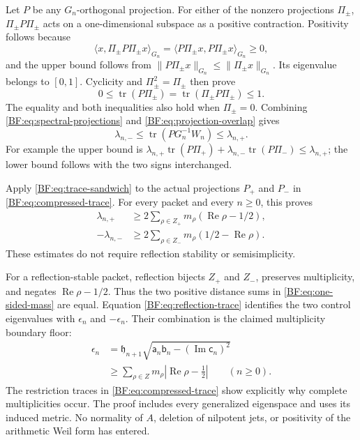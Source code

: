 Let \(P\) be any \(G_n\)-orthogonal projection.
For either of the nonzero projections \(\Pi_\pm\),
\(\Pi_\pm P\Pi_\pm\) acts on a one-dimensional subspace as a
positive contraction.  Positivity follows because
\[
\langle x,\Pi_\pm P\Pi_\pm x\rangle_{G_n}
=\langle P\Pi_\pm x,P\Pi_\pm x\rangle_{G_n}\ge0,
\]
and the upper bound follows from
\(\|P\Pi_\pm x\|_{G_n}\le\|\Pi_\pm x\|_{G_n}\).
Its eigenvalue belongs to \([0,1]\).
Cyclicity and \(\Pi_\pm^2=\Pi_\pm\) then prove
\begin{equation}
0\le\operatorname{tr}(P\Pi_\pm)
 =\operatorname{tr}(\Pi_\pm P\Pi_\pm)\le1.
\tag{BF.33}\label{BF:eq:projection-overlap}
\end{equation}
The equality and both inequalities also hold when \(\Pi_\pm=0\).
Combining \eqref{BF:eq:spectral-projections} and
\eqref{BF:eq:projection-overlap} gives
\begin{equation}
\lambda_{n,-}
\le\operatorname{tr}(P G_n^{-1}W_n)
\le\lambda_{n,+}.
\tag{BF.34}\label{BF:eq:trace-sandwich}
\end{equation}
For example the upper bound is
\(\lambda_{n,+}\operatorname{tr}(P\Pi_+)
+\lambda_{n,-}\operatorname{tr}(P\Pi_-)\le\lambda_{n,+}\);
the lower bound follows with the two signs interchanged.

Apply \eqref{BF:eq:trace-sandwich} to the actual projections
\(P_+\) and \(P_-\) in \eqref{BF:eq:compressed-trace}.
For every packet and every \(n\ge0\), this proves
\begin{equation}
\boxed{\begin{aligned}
\lambda_{n,+}
 &\ge2\sum_{\rho\in Z_+}
          m_\rho(\operatorname{Re}\rho-1/2),\\
-\lambda_{n,-}
 &\ge2\sum_{\rho\in Z_-}
          m_\rho(1/2-\operatorname{Re}\rho).
\end{aligned}}
\tag{BF.35}\label{BF:eq:one-sided-mass}
\end{equation}
These estimates do not require reflection stability or
semisimplicity.

For a reflection-stable packet, reflection bijects \(Z_+\) and
\(Z_-\), preserves multiplicity, and negates
\(\operatorname{Re}\rho-1/2\).  Thus the two positive distance
sums in \eqref{BF:eq:one-sided-mass} are equal.
Equation \eqref{BF:eq:reflection-trace} identifies the two control
eigenvalues with \(\epsilon_n\) and \(-\epsilon_n\).
Their combination is the claimed multiplicity boundary floor:
\begin{equation}
\boxed{\begin{aligned}
\epsilon_n
 &=\mathfrak h_{n+1}
   \sqrt{\mathsf a_n\mathsf b_n-
                 (\operatorname{Im}\mathsf c_n)^2}\\
 &\ge\sum_{\rho\in Z}m_\rho
               \left|\operatorname{Re}\rho-\frac12\right|
 \qquad(n\ge0).
\end{aligned}}
\tag{BF.36}\label{BF:eq:boundary-floor}
\end{equation}
The restriction traces in \eqref{BF:eq:compressed-trace} show
explicitly why complete multiplicities occur.  The proof includes
every generalized eigenspace and uses its induced metric.  No
normality of \(A\), deletion of nilpotent jets, or positivity of
the arithmetic Weil form has entered.

